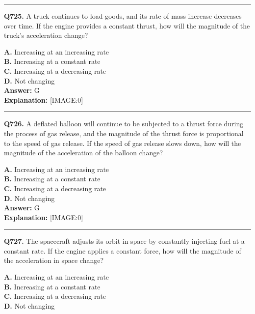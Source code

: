 \documentclass[12pt]{article}
\begin{document}
\hrule
\vspace{1em}


\noindent
\textbf{Q725.} A truck continues to load goods, and its rate of mass increase decreases over time. If the engine provides a constant thrust, how will the magnitude of the truck's acceleration change?



\textbf{A.} Increasing at an increasing rate \\
\textbf{B.} Increasing at a constant rate \\
\textbf{C.} Increasing at a decreasing rate \\
\textbf{D.} Not changing \\

\textbf{Answer:} G \\
\textbf{Explanation:} [IMAGE:0]

\hrule
\vspace{1em}


\noindent
\textbf{Q726.} A deflated balloon will continue to be subjected to a thrust force during the process of gas release, and the magnitude of the thrust force is proportional to the speed of gas release. If the speed of gas release slows down, how will the magnitude of the acceleration of the balloon change?



\textbf{A.} Increasing at an increasing rate \\
\textbf{B.} Increasing at a constant rate \\
\textbf{C.} Increasing at a decreasing rate \\
\textbf{D.} Not changing \\

\textbf{Answer:} G \\
\textbf{Explanation:} [IMAGE:0]

\hrule
\vspace{1em}


\noindent
\textbf{Q727.} The spacecraft adjusts its orbit in space by constantly injecting fuel at a constant rate. If the engine applies a constant force, how will the magnitude of the acceleration in space change?



\textbf{A.} Increasing at an increasing rate \\
\textbf{B.} Increasing at a constant rate \\
\textbf{C.} Increasing at a decreasing rate \\
\textbf{D.} Not changing \\
\end{document}
